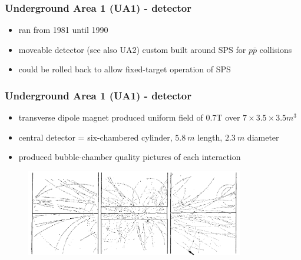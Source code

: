 \documentclass[xcolor=table]{beamer}
\begin{document}

\begin{frame}
\frametitle{Underground Area 1 (UA1) - detector}
\fontsize{12pt}{12}\selectfont

\begin{itemize}
\item ran from 1981 until 1990
\item moveable detector (see also UA2) custom built around SPS for $p\bar{p}$ collisions
\item could be rolled back to allow fixed-target operation of SPS
\end{itemize}



\end{frame}


\begin{frame}
\frametitle{Underground Area 1 (UA1) - detector}
\fontsize{9pt}{12}\selectfont

\begin{itemize}
\item transverse dipole magnet produced uniform field of 0.7T over $7\times 3.5\times 3.5\si{m^3}$
\item central detector = six-chambered cylinder, $\SI{5.8}{m}$ length, $\SI{2.3}{m}$ diameter
\item produced bubble-chamber quality pictures of each interaction
\end{itemize}

\begin{figure}[h]
\centering
\includegraphics[width=0.85\textwidth]{images/track-imaging.png}
\end{figure}


\end{frame}
\end{document}
